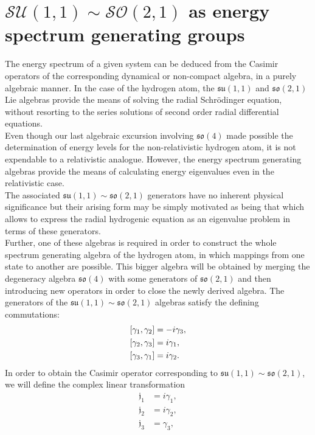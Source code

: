 \documentclass[12pt,a4paper]{report}
\theoremstyle{definition}
\theoremstyle{remark}
\theoremstyle{remark}
\begin{document}
\chapter{$\mathcal{SU}(1,1)\sim \mathcal{SO}(2,1)$ as energy spectrum generating groups}
The energy spectrum of a given system can be deduced from the Casimir operators of the corresponding dynamical or non-compact algebra, in a purely algebraic manner. In the case of the hydrogen atom, the $\mathfrak{su}(1,1)$ and $\mathfrak{so}(2,1)$ Lie algebras provide the means of solving the radial Schrödinger equation, without resorting to the series solutions of second order radial differential equations. \\ \indent
Even though our last algebraic excursion involving $\mathfrak{so}(4)$ made possible the determination of energy levels for the non-relativistic hydrogen atom, it is not expendable to a relativistic analogue. However, the energy spectrum generating algebras provide the means of calculating energy eigenvalues even in the relativistic case.\\ \indent
The associated $\mathfrak{su}(1,1)\sim \mathfrak{so}(2,1)$ generators have no inherent physical significance but their arising form may be simply motivated as being that which allows to express the radial hydrogenic equation as an eigenvalue problem in terms of these generators. \\ \indent 
Further, one of these algebras is required in order to construct the whole spectrum generating algebra of the hydrogen atom, in which mappings from one state to another are possible. This bigger algebra will be obtained by merging the degeneracy algebra $\mathfrak{so}(4)$ with some generators of $\mathfrak{so}(2,1)$ and then introducing new operators in order to close the newly derived algebra.
The generators of the $\mathfrak{su}(1,1)\sim \mathfrak{so}(2,1)$ algebras satisfy the defining commutations:
\begin{equation}\label{esu11.0}
\begin{aligned} \relax
[\gamma_1,\gamma_2]&=-i\gamma_3, \\
[\gamma_2,\gamma_3]&=i\gamma_1, \\
[\gamma_3,\gamma_1]&=i\gamma_2. 
\end{aligned}
\end{equation}
In order to obtain the Casimir operator corresponding to $\mathfrak{su}(1,1)\sim\mathfrak{so}(2,1)$, we will define the complex linear transformation
\begin{align*}
\mathfrak{j}_1&=i\gamma_1, \\
\mathfrak{j}_2&=i\gamma_2, \\
\mathfrak{j}_3&=\gamma_3,
\end{align*}
\end{document}
